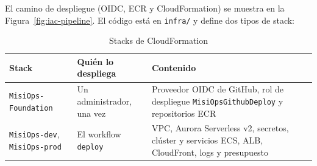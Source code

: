 El camino de despliegue (OIDC, ECR y CloudFormation) se muestra en la Figura~\ref{fig:iac-pipeline}. El código está en \texttt{infra/} y define dos tipos de stack:

\begin{table}[H]
    \centering
    \small
    \caption{Stacks de CloudFormation}
    \begin{tabularx}{\textwidth}{@{}p{3.3cm} p{3.2cm} X@{}}
        \toprule
        \textbf{Stack} & \textbf{Quién lo despliega} & \textbf{Contenido} \\
        \midrule
        \texttt{MisiOps-Foundation} & Un administrador, una vez & Proveedor OIDC de GitHub, rol de despliegue \texttt{MisiOpsGithubDeploy} y repositorios ECR \\
        \texttt{MisiOps-dev}, \texttt{MisiOps-prod} & El workflow \texttt{deploy} & VPC, Aurora Serverless v2, secretos, clúster y servicios ECS, ALB, CloudFront, logs y presupuesto \\
        \bottomrule
    \end{tabularx}
\end{table}

